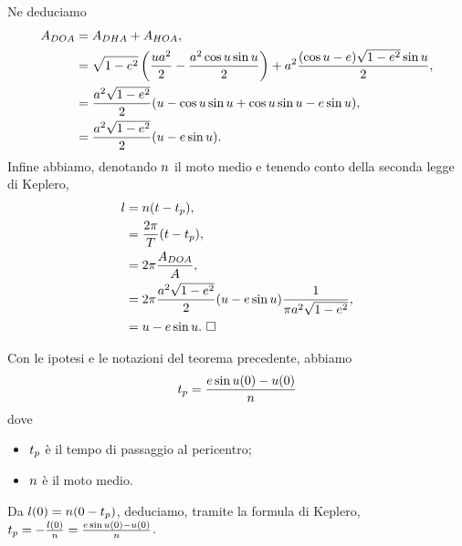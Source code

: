 \par Ne deduciamo
\begin{align*}
	A_{DOA}
	&= A_{DHA} + A_{HOA},\\
	&= \sqrt{1 - e^2} \left ( \frac{u a^2}{2} - \frac{a^2 \cos{u} \sin{u}}{2} \right ) + a^2 \frac{(\cos{u} - e) \sqrt{1 - e^2} \sin{u}}{2},\\
	&= \frac{a^2\sqrt{1 - e^2}}{2} ( u - \cos{u} \sin{u} + \cos{u} \sin{u} - e \sin{u} ),\\
	&= \frac{a^2\sqrt{1 - e^2}}{2} ( u - e \sin{u} ).
\end{align*}
Infine abbiamo, denotando $n$ il moto medio e tenendo conto della seconda legge di Keplero,
\begin{align*}
	l
	&= n (t - {t_p}),\\
	&= \frac{2 \pi}{T} (t - {t_p}),\\
	&= 2 \pi \frac{A_{DOA}}{A},\\
	&= 2 \pi \frac{a^2\sqrt{1 - e^2}}{2} ( u - e \sin{u} ) \frac{1}{\pi a^2 \sqrt{1 - e^2}},\\
	&= u - e \sin{u}.\text{ $\square$}
\end{align*}
\begin{Corollary}
	Con le ipotesi e le notazioni del teorema precedente, abbiamo
	\[
		{t_p} = \frac{e \sin{u(0)} - u(0)}{n}
	\]
	dove
	\begin{itemize}
		\item ${t_p}$ \`e il tempo di passaggio al pericentro;
		\item $n$ \`e il moto medio.
	\end{itemize}
\end{Corollary}
\Proof Da $l(0) = n(0 - {t_p})$,
deduciamo, tramite la formula di Keplero,
${t_p}
= - \frac{l(0)}{n}
= \frac{e \sin{u(0)} - u(0)}{n}$.
\EndProof
